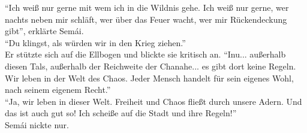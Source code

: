 ``Ich weiß nur gerne mit wem ich in die Wildnis gehe. Ich weiß nur gerne, wer nachts neben mir 
schläft, wer über das Feuer wacht, wer mir Rückendeckung gibt'', erklärte Semái.\\
``Du klingst, als würden wir in den Krieg ziehen.''\\
Er stützte sich auf die Ellbogen und blickte sie kritisch an. ``Inu... außerhalb diesen Tals, 
außerhalb der Reichweite der Chanahe... es gibt dort keine Regeln. Wir leben in der Welt des Chaos. 
Jeder Mensch handelt für sein eigenes Wohl, nach seinem eigenem Recht.''\\
``Ja, wir leben in dieser Welt. Freiheit und Chaos fließt durch unsere Adern. Und das ist auch gut 
so! Ich scheiße auf die Stadt und ihre Regeln!''\\
Semái nickte nur.\\

